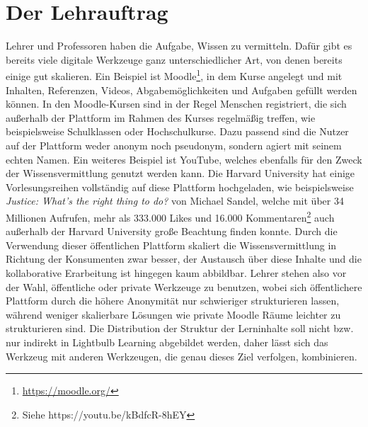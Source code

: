\section{Der Lehrauftrag}
\label{sec:teach}
Lehrer und Professoren haben die Aufgabe, Wissen zu vermitteln. Dafür gibt es bereits viele digitale Werkzeuge ganz unterschiedlicher Art, von denen bereits einige gut skalieren. Ein Beispiel ist Moodle\footnote{\url{https://moodle.org/}}, in dem Kurse angelegt und mit Inhalten, Referenzen, Videos, Abgabemöglichkeiten und Aufgaben gefüllt werden können. In den Moodle-Kursen sind in der Regel Menschen registriert, die sich außerhalb der Plattform im Rahmen des Kurses regelmäßig treffen, wie beispielsweise Schulklassen oder Hochschulkurse. Dazu passend sind die Nutzer auf der Plattform weder anonym noch pseudonym, sondern agiert mit seinem echten Namen. Ein weiteres Beispiel ist YouTube, welches ebenfalls für den Zweck der Wissensvermittlung genutzt werden kann. Die Harvard University hat einige Vorlesungsreihen vollständig auf diese Plattform hochgeladen, wie beispielsweise \emph{Justice: What's the right thing to do?} von Michael Sandel, welche mit über 34 Millionen Aufrufen, mehr als 333.000 Likes und 16.000 Kommentaren\footnote{Siehe https://youtu.be/kBdfcR-8hEY} auch außerhalb der Harvard University große Beachtung finden konnte. Durch die Verwendung dieser öffentlichen Plattform skaliert die Wissensvermittlung in Richtung der Konsumenten zwar besser, der Austausch über diese Inhalte und die kollaborative Erarbeitung ist hingegen kaum abbildbar. Lehrer stehen also vor der Wahl, öffentliche oder private Werkzeuge zu benutzen, wobei sich öffentlichere Plattform durch die höhere Anonymität nur schwieriger strukturieren lassen, während weniger skalierbare Lösungen wie private Moodle Räume leichter zu strukturieren sind. Die Distribution der Struktur der Lerninhalte soll nicht bzw. nur indirekt in Lightbulb Learning abgebildet werden, daher lässt sich das Werkzeug mit anderen Werkzeugen, die genau dieses Ziel verfolgen, kombinieren.

